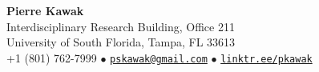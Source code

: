 \documentclass[letterpaper,11pt]{article}
\def\name{Pierre Kawak}
\begin{document}


\begin{center}
  {\LARGE \textbf{Pierre Kawak} }\\[1ex]
  Interdisciplinary Research Building, Office 211 \\
  University of South Florida, Tampa, FL 33613 \\  
  +1 (801) 762-7999 $\bullet$ \href{mailto:pskawak@gmail.com}{\tt pskawak@gmail.com} $\bullet$ \href{https://linktr.ee/pkawak}{\tt linktr.ee/pkawak} \\
\end{center}


\end{document}
